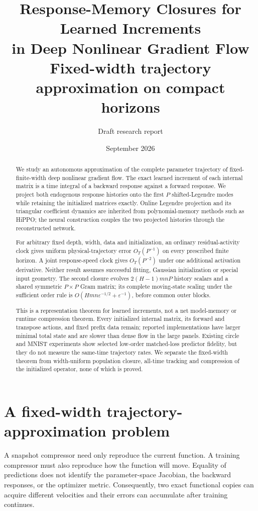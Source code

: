 \documentclass[11pt]{article}
\title{Response-Memory Closures for Learned Increments\\
in Deep Nonlinear Gradient Flow\\
\large Fixed-width trajectory approximation on compact horizons}
\author{Draft research report}
\date{September 2026}
\theoremstyle{definition}
\theoremstyle{remark}
\begin{document}
\maketitle

\begin{abstract}
We study an autonomous approximation of the complete parameter trajectory of
fixed-finite-width deep nonlinear gradient flow.  The exact learned increment of
each internal matrix is a time integral of a backward response against a forward
response.  We project both endogenous response histories onto the first $P$
shifted-Legendre modes while retaining the initialized matrices exactly.  Online
Legendre projection and its triangular coefficient dynamics are inherited from
polynomial-memory methods such as HiPPO; the neural construction couples the two
projected histories through the reconstructed network.

For arbitrary fixed depth, width, data and initialization, an
ordinary residual-activity clock gives uniform physical-trajectory error
$O_T(P^{-1})$ on every prescribed finite horizon.  A joint response-speed clock
gives $O_T(P^{-2})$ under one additional activation derivative.  Neither result
assumes successful fitting, Gaussian initialization or special input geometry.
The second closure evolves $2(H-1)mnP$ history scalars and a shared symmetric
$P\times P$ Gram matrix; its complete moving-state scaling under the sufficient
order rule is
$O(Hmn\varepsilon^{-1/2}+\varepsilon^{-1})$, before common outer blocks.

This is a representation theorem for learned increments, not a net model-memory
or runtime compression theorem.  Every initialized internal matrix, its forward
and transpose actions, and fixed prefix data remain; reported implementations
have larger minimal total state and are slower than dense flow in the large
panels.  Existing circle and MNIST experiments show selected low-order
matched-loss predictor fidelity, but they do not measure the same-time trajectory
rates.  We separate the fixed-width theorem from width-uniform population
closure, all-time tracking and compression of the initialized operator, none of
which is proved.
\end{abstract}

\section{A fixed-width trajectory-approximation problem}

A snapshot compressor need only reproduce the current function.  A training
compressor must also reproduce how the function will move.  Equality of
predictions does not identify the parameter-space Jacobian, the backward
responses, or the optimizer metric.  Consequently, two exact functional copies
can acquire different velocities and their errors can accumulate after training
continues.
\end{document}

